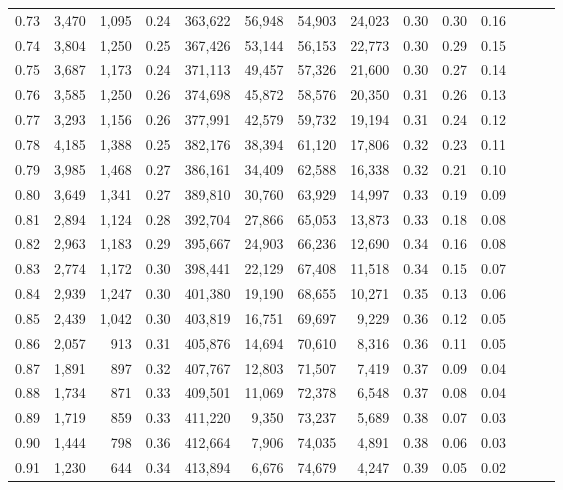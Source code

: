 \begin{tabular}{rrrrrrrrrrrrrr}
0.73 &  3,470 &  1,095 &  0.24 &  363,622 &   56,948 &  54,903 &  24,023 &  0.30 &  0.30 &      0.16 \\
0.74 &  3,804 &  1,250 &  0.25 &  367,426 &   53,144 &  56,153 &  22,773 &  0.30 &  0.29 &      0.15 \\
0.75 &  3,687 &  1,173 &  0.24 &  371,113 &   49,457 &  57,326 &  21,600 &  0.30 &  0.27 &      0.14 \\
0.76 &  3,585 &  1,250 &  0.26 &  374,698 &   45,872 &  58,576 &  20,350 &  0.31 &  0.26 &      0.13 \\
0.77 &  3,293 &  1,156 &  0.26 &  377,991 &   42,579 &  59,732 &  19,194 &  0.31 &  0.24 &      0.12 \\
0.78 &  4,185 &  1,388 &  0.25 &  382,176 &   38,394 &  61,120 &  17,806 &  0.32 &  0.23 &      0.11 \\
0.79 &  3,985 &  1,468 &  0.27 &  386,161 &   34,409 &  62,588 &  16,338 &  0.32 &  0.21 &      0.10 \\
0.80 &  3,649 &  1,341 &  0.27 &  389,810 &   30,760 &  63,929 &  14,997 &  0.33 &  0.19 &      0.09 \\
0.81 &  2,894 &  1,124 &  0.28 &  392,704 &   27,866 &  65,053 &  13,873 &  0.33 &  0.18 &      0.08 \\
0.82 &  2,963 &  1,183 &  0.29 &  395,667 &   24,903 &  66,236 &  12,690 &  0.34 &  0.16 &      0.08 \\
0.83 &  2,774 &  1,172 &  0.30 &  398,441 &   22,129 &  67,408 &  11,518 &  0.34 &  0.15 &      0.07 \\
0.84 &  2,939 &  1,247 &  0.30 &  401,380 &   19,190 &  68,655 &  10,271 &  0.35 &  0.13 &      0.06 \\
0.85 &  2,439 &  1,042 &  0.30 &  403,819 &   16,751 &  69,697 &   9,229 &  0.36 &  0.12 &      0.05 \\
0.86 &  2,057 &    913 &  0.31 &  405,876 &   14,694 &  70,610 &   8,316 &  0.36 &  0.11 &      0.05 \\
0.87 &  1,891 &    897 &  0.32 &  407,767 &   12,803 &  71,507 &   7,419 &  0.37 &  0.09 &      0.04 \\
0.88 &  1,734 &    871 &  0.33 &  409,501 &   11,069 &  72,378 &   6,548 &  0.37 &  0.08 &      0.04 \\
0.89 &  1,719 &    859 &  0.33 &  411,220 &    9,350 &  73,237 &   5,689 &  0.38 &  0.07 &      0.03 \\
0.90 &  1,444 &    798 &  0.36 &  412,664 &    7,906 &  74,035 &   4,891 &  0.38 &  0.06 &      0.03 \\
0.91 &  1,230 &    644 &  0.34 &  413,894 &    6,676 &  74,679 &   4,247 &  0.39 &  0.05 &      0.02 \\

\end{tabular}
